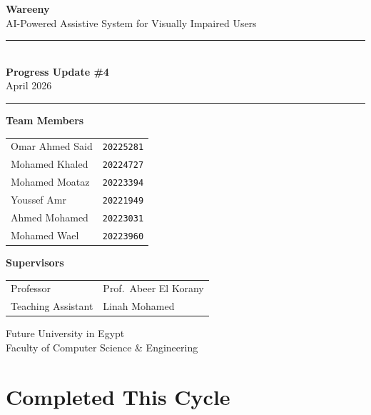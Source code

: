 \documentclass[12pt, a4paper]{article}
\begin{document}
\begin{titlepage}
  \centering
  \vspace*{3cm}

  {\Huge\bfseries\color{primary} Wareeny}\\[0.4cm]
  {\large\color{gray} AI-Powered Assistive System for Visually Impaired Users}

  \vspace{1.5cm}
  \rule{0.6\textwidth}{1pt}\\[0.5cm]
  {\LARGE\bfseries Progress Update \#4}\\[0.2cm]
  {\large\color{gray} April 2026}\\[0.5cm]
  \rule{0.6\textwidth}{1pt}

  \vspace{2cm}

  {\large\bfseries Team Members}\\[0.4cm]
  \begin{tabular}{ll}
    Omar Ahmed Said  & \texttt{20225281} \\[4pt]
    Mohamed Khaled   & \texttt{20224727} \\[4pt]
    Mohamed Moataz   & \texttt{20223394} \\[4pt]
    Youssef Amr      & \texttt{20221949} \\[4pt]
    Ahmed Mohamed    & \texttt{20223031} \\[4pt]
    Mohamed Wael     & \texttt{20223960} \\
  \end{tabular}

  \vspace{1.5cm}

  {\large\bfseries Supervisors}\\[0.4cm]
  \begin{tabular}{ll}
    Professor          & Prof.\ Abeer El Korany \\[4pt]
    Teaching Assistant & Linah Mohamed \\
  \end{tabular}

  \vspace{2cm}
  {\small\color{gray} Future University in Egypt \\ Faculty of Computer Science \& Engineering}
\end{titlepage}

\section{Completed This Cycle}
\end{document}
